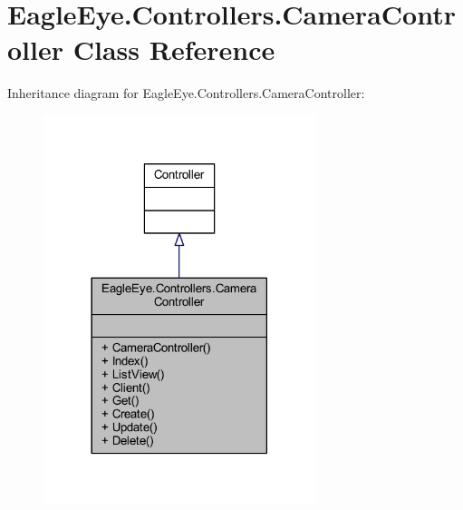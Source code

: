 \hypertarget{class_eagle_eye_1_1_controllers_1_1_camera_controller}{}\section{Eagle\+Eye.\+Controllers.\+Camera\+Controller Class Reference}
\label{class_eagle_eye_1_1_controllers_1_1_camera_controller}


Inheritance diagram for Eagle\+Eye.\+Controllers.\+Camera\+Controller\+:
\nopagebreak
\begin{figure}[H]
\begin{center}
\leavevmode
\includegraphics[width=225pt]{class_eagle_eye_1_1_controllers_1_1_camera_controller__inherit__graph}
\end{center}
\end{figure}


